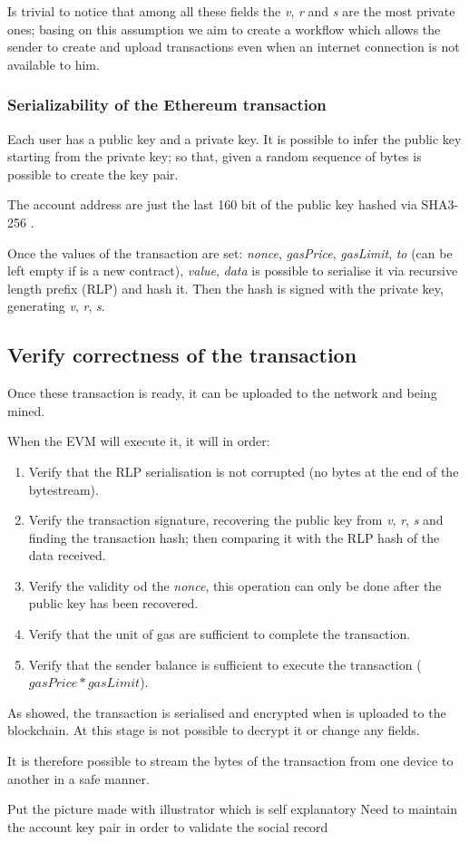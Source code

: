 Is trivial to notice that among all these fields the \textit{v}, \textit{r} and \textit{s} are the most private ones; basing on this assumption we aim to create a workflow which allows the sender to create and upload transactions even when an internet connection is not available to him. 

\subsubsection{Serializability of the Ethereum transaction}
Each user has a public key and a private key. It is possible to infer the public key starting from the private key; so that, given a random sequence of bytes is possible to create the key pair.

The account address are just the last 160 bit of the public key hashed via SHA3-256 \cite{sha3_256_keccak}.

Once the values of the transaction are set: \textit{nonce}, \textit{gasPrice}, \textit{gasLimit}, \textit{to} (can be left empty if is a new contract), \textit{value}, \textit{data} is possible to serialise it via recursive length prefix (RLP) \cite{ethereum_whitepaper} and hash it. Then the hash is signed with the private key, generating \textit{v}, \textit{r}, \textit{s}.

\subsection{Verify correctness of the transaction}
Once these transaction is ready, it can be uploaded to the network and being mined.

When the EVM will execute it, it will in order:
\begin{enumerate}
  \item Verify that the RLP serialisation is not corrupted (no bytes at the end of the bytestream).
  \item Verify the transaction signature, recovering the public key from \textit{v}, \textit{r}, \textit{s} and finding the transaction hash; then comparing it with the RLP hash of the data received.
  \item Verify the validity od the \textit{nonce}, this operation can only be done after the public key has been recovered.
  \item Verify that the unit of gas are sufficient to complete the transaction.
  \item Verify that the sender balance is sufficient to execute the transaction ($gasPrice * gasLimit$).
\end{enumerate}

As showed, the transaction is serialised and encrypted when is uploaded to the blockchain.
At this stage is not possible to decrypt it or change any fields.

It is therefore possible to stream the bytes of the transaction from one device to another in a safe manner.


\begin{notation}
  Put the picture made with illustrator which is self explanatory
  Need to maintain the account key pair in order to validate the social record
\end{notation}